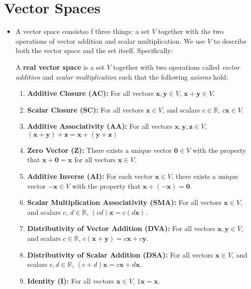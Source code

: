 \section{Vector Spaces}
\begin{itemize}
    \item A vector space consistso f three things: a set $V$ together with the two operations of vector addition and scalar multiplication. We use $V$ to describe both the vector space and the set itself. Specifically:
    \begin{definition}
        A \textbf{real vector space} is a set $V$ together with two operations called \textit{vector addition} and \textit{scalar multiplication} such that the following \textit{axioms} hold:
        \vspace{2mm}
        \begin{enumerate}
            \setlength\itemsep{1em}
            \item \textbf{Additive Closure (AC):} For all vectors $\bm{x}, \bm{y} \in V$, $\bm{x}+\bm{y} \in V$.
            \item \textbf{Scalar Closure (SC):} For all vectors $\bm{x} \in V$, and scalars $c \in \mathbb{R}$, $c\bm{x} \in V$.
            \item \textbf{Additive Associativity (AA):} For all vectors $\bm{x},\bm{y},\bm{z} \in V$, $(\bm{x}+\bm{y})+\bm{z} = \bm{x} + (\bm{y}+\bm{z})$
            \item \textbf{Zero Vector (Z):} There exists a unique vector $\bm{0} \in V$ with the property that $\bm{x}+\bm{0}=\bm{x}$ for all vectors $\bm{x} \in V$.
            \item \textbf{Additive Inverse (AI):} For each vector $\bm{x} \in V$, there exists a unique vector $-\bm{x} \in V$ with the property that $\bm{x} + (-\bm{x})=\bm{0}$.
            \item \textbf{Scalar Multiplication Associativity (SMA):} For all vectors $\bm{x} \in V$, and scalars $c$, $d\in \mathbb{R}$, $(cd)\bm{x} = c(d\bm{x})$.
            \item \textbf{Distributivity of Vector Addition (DVA):} For all vectors $\bm{x},\bm{y} \in V$, and scalars $c \in \mathbb{R}$, $c(\bm{x}+\bm{y})=c\bm{x}+c\bm{y}$.
            \item \textbf{Distributivity of Scalar Addition (DSA):} For all vectors $\bm{x} \in V$, and scalars $c,d \in \mathbb{R}$, $(c+d)\bm{x}=c\bm{x}+d\bm{x}$.
            \item \textbf{Identity (I):} For all vectors $\bm{x} \in V$, $1\bm{x} = \bm{x}$.

\end{enumerate}
\end{definition}
\end{itemize}
